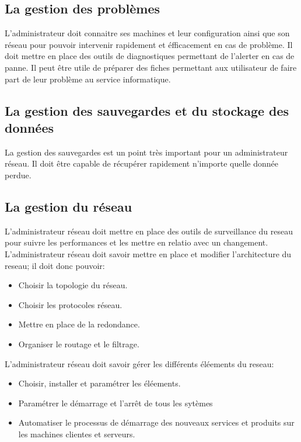 \documentclass[10pt,a4paper]{article}
\begin{document}
 \subsection{La gestion des problèmes}
 L'administrateur doit connaitre ses machines et leur configuration ainsi que son réseau pour pouvoir intervenir rapidement et éfficacement en cas de problème.
 Il doit mettre en place des outils de diagnostiques permettant de l'alerter en cas de panne.
 Il peut être utile de préparer des fiches permettant aux utilisateur de faire part de leur problème au service informatique.

 \subsection{La gestion des sauvegardes et du stockage des données}
 La gestion des sauvegardes est un point très important pour un administrateur réseau. Il doit être capable de récupérer rapidement n'importe quelle donnée perdue.

 \subsection{La gestion du réseau}
 L'administrateur réseau doit mettre en place des outils de surveillance du reseau pour suivre les performances et les mettre en relatio avec un changement.\\
 L'administrateur réseau doit savoir mettre en place et modifier l'architecture du reseau; il doit donc pouvoir:
 \begin{itemize}
	 \item Choisir la topologie du réseau.
	 \item Choisir les protocoles réseau.
	 \item Mettre en place de la redondance.
	 \item Organiser le routage et le filtrage.
 \end{itemize}
 L'administrateur réseau doit savoir gérer les différents éléements du reseau:
 \begin{itemize}
	 \item Choisir, installer et paramétrer les éléements.
	 \item Paramétrer le démarrage et l'arrêt de tous les sytèmes
	 \item Automatiser le processus de démarrage des nouveaux services et produits sur les machines clientes et serveurs.
 \end{itemize}
\end{document}
